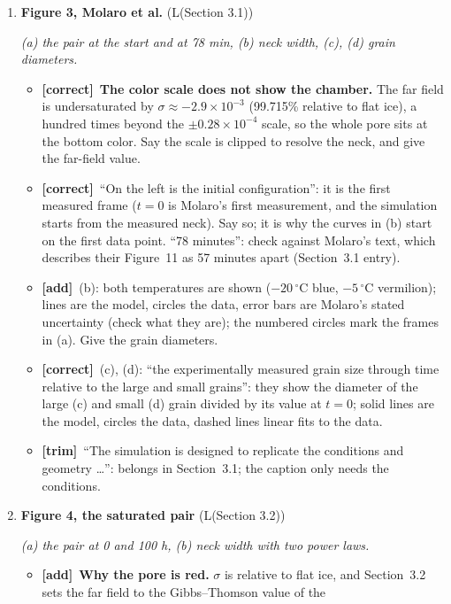 \documentclass[11pt]{article}
\newcommand{\Pg}[3]{\item \textbf{#1} {\small(#2)}\par\textit{#3}}
\newcommand{\tC}{\textcolor{miss}{\textbf{[correct]}}\ }
\newcommand{\tG}{\textcolor{stale}{\textbf{[wording]}}\ }
\newcommand{\tT}{\textcolor{cut}{\textbf{[trim]}}\ }
\newcommand{\tA}{\textcolor{have}{\textbf{[add]}}\ }
\begin{document}
\begin{enumerate}
\begin{itemize}
    in the $x$ direction'' is right; ``brightness of the path'':
    ``brighter paths carry more heat''.
  \item \tG ``the mesh in which we solve our homogenization model over'':
    ``the mesh on which the cell problem is solved''.
  \end{itemize}
\Pg{Figure 3, Molaro et al.}{L(Section 3.1)}{(a) the pair at the start and at 78 min, (b) neck width, (c), (d) grain diameters.}
  \begin{itemize}
  \item \tC \textbf{The color scale does not show the chamber.} The far
    field is undersaturated by $\sigma \approx -2.9\times10^{-3}$ (99.715\%
    relative to flat ice), a hundred times beyond the $\pm0.28\times10^{-4}$
    scale, so the whole pore sits at the bottom color. Say the scale is
    clipped to resolve the neck, and give the far-field value.
  \item \tC ``On the left is the initial configuration'': it is the first
    measured frame ($t = 0$ is Molaro's first measurement, and the
    simulation starts from the measured neck). Say so; it is why the curves
    in (b) start on the first data point. ``78 minutes'': check against
    Molaro's text, which describes their Figure~11 as 57 minutes apart
    (Section~3.1 entry).
  \item \tA (b): both temperatures are shown ($-20\,^{\circ}$C blue,
    $-5\,^{\circ}$C vermilion); lines are the model, circles the data, error
    bars are Molaro's stated uncertainty (check what they are); the numbered
    circles mark the frames in (a). Give the grain diameters.
  \item \tC (c), (d): ``the experimentally measured grain size through time
    relative to the large and small grains'': they show the diameter of the
    large (c) and small (d) grain divided by its value at $t = 0$; solid
    lines are the model, circles the data, dashed lines linear fits to the
    data.
  \item \tT ``The simulation is designed to replicate the conditions and
    geometry \ldots'': belongs in Section~3.1; the caption only needs the
    conditions.
  \end{itemize}
\Pg{Figure 4, the saturated pair}{L(Section 3.2)}{(a) the pair at 0 and 100 h, (b) neck width with two power laws.}
  \begin{itemize}
  \item \tA \textbf{Why the pore is red.} $\sigma$ is relative to flat ice,
    and Section~3.2 sets the far field to the Gibbs--Thomson value of the

\end{itemize}
\end{enumerate}
\end{document}
